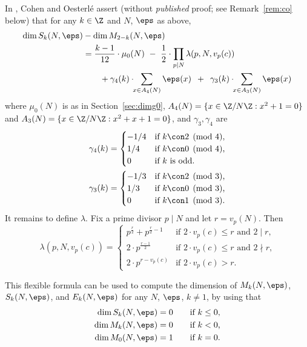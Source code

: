 In \cite{cohen-oesterle:dimensions}, Cohen and 
Oesterl\'e assert (without {\em published} proof; see Remark~\ref{rem:co} below) 
that for any $k\in\Z$ and $N$, $\eps$
as above,
\begin{align*}
\dim S_k(N,\eps) &- \dim M_{2-k}(N,\eps)\\
  &= \frac{k-1}{12} \cdot \mu_0(N) \,\,-\,\,
         \frac{1}{2} \cdot \prod_{p\mid N} \lambda(p, N, v_p(c))\\
  &\qquad + \gamma_4(k) \cdot\!\! 
\sum_{x \in A_4(N)} \eps(x) \,\,\,+\,\,\, 
   \gamma_3(k) \cdot \!\! \sum_{x \in A_3(N)} \eps(x)
\end{align*}
where $\mu_0(N)$ is as in Section~\ref{sec:dimg0},
$A_4(N) = \{x \in \Z/N\Z : x^2 +1 = 0\}$ and
$A_3(N) = \{x \in \Z/N\Z : x^2 + x + 1 = 0 \}$,
and $\gamma_3, \gamma_4$ are
\begin{align*}
\gamma_4(k) &= 
    \begin{cases}
     -1/4 & \text{if $k\con 2\pmod{4}$,}\\
      1/4 & \text{if $k\con 0\pmod{4}$,}\\
        0 & \text{if $k$ is odd.}
     \end{cases}\\
\gamma_3(k) &= 
    \begin{cases}
     -1/3 & \text{if $k\con 2\pmod{3}$,}\\
      1/3 & \text{if $k\con 0\pmod{3}$,}\\
        0 & \text{if $k\con 1\pmod{3}$.}
     \end{cases}
\end{align*}
It remains to define $\lambda$.  
Fix a prime divisor $p\mid N$ and let $r=v_p(N)$.
Then 
$$
\lambda(p,N,v_p(c)) = 
    \begin{cases}
      p^{\frac{r}{2}} + p^{\frac{r}{2} - 1} & \text{if $2\cdot v_p(c)\leq r$ and $2\mid r$,}\\
     2\cdot p^{\frac{r-1}{2}} & \text{if $2\cdot v_p(c)\leq r$ and $2\nmid r$,}\\
     2\cdot p^{r-v_p(c)} & \text{if $2\cdot v_p(c) > r$.}
   \end{cases}
$$   

This flexible formula can be used to compute the dimension of
$M_k(N,\eps)$, 
$S_k(N,\eps)$, and $E_k(N,\eps)$ for any $N$, $\eps$, $k\neq 1$,
by using that
\begin{align*}
  \dim S_k(N,\eps) &= 0 \qquad \text{if $k\leq 0$,}\\
  \dim M_k(N,\eps) &= 0 \qquad \text{if $k<0$,}\\
  \dim M_0(N,\eps) &= 1 \qquad \text{if $k=0$.}
\end{align*}


